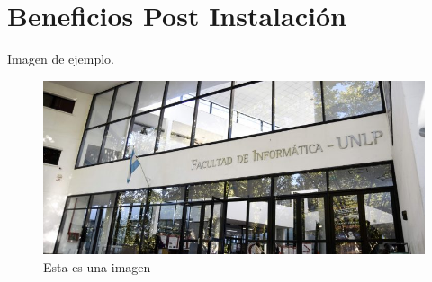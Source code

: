 \chapter{Beneficios Post Instalación}
\label{Beneficios Post Instalación}

Imagen de ejemplo.

\begin{figure}[H]
\begin{center}
\includegraphics[width=1\linewidth,frame]{imagenes/Imagen1.jpg}
\caption{Esta es una imagen}
\label{imagen1}
\end{center}
\end{figure}